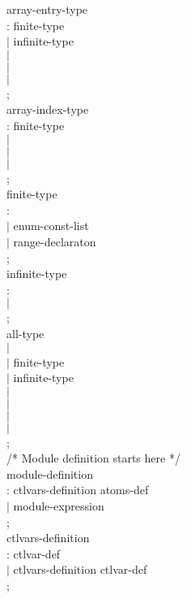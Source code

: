 \begin{tab}
\begin{tabbing}
array-entry-type \\
\>:   finite-type \\
\>$|$ infinite-type \\
\>$|$ \ENUMID \\
\>$|$ \RANGEID \\
\>$|$ \BITVECID \\
\>;\\

array-index-type \\
\>:   finite-type \\
\>$|$ \ENUMID \\
\>$|$ \RANGEID \\
\>$|$ \BITVECID \\
\>;\\

finite-type \\
\>: \BOOL \\
\>$|$ enum-const-list \\
\>$|$ range-declaraton \\
\>;\\

infinite-type \\
\>: \INT \\
\>$|$ \NAT \\
\>;\\

all-type \\
\>$|$ \EVENT \\
\>$|$ finite-type \\
\>$|$ infinite-type \\
\>$|$ \ENUMID \\
\>$|$ \BITVECID \\
\>$|$ \ARRAYID \\
\>$|$ \RANGEID \\
\>;\\



/* Module definition starts here */ \\

module-definition \\
\>: \TTMODULE \MODULEID ctlvars-definition atoms-def \ENDMODULE \\
\>$|$ \MODULEID \ASSIGN module-expression \\
\>; \\

ctlvars-definition \\
\>: ctlvar-def \\
\>$|$ ctlvars-definition ctlvar-def \\
\>; \\


\end{tabbing}
\end{tab}
